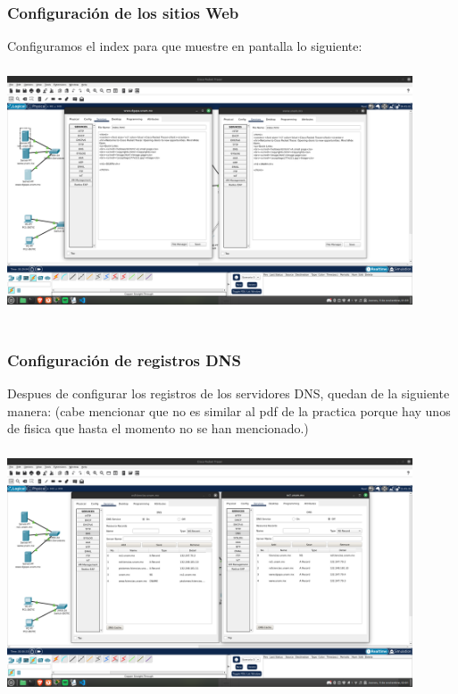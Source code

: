 \documentclass[14pt]{book}
\begin{document}
{\color{red} \subsubsection*{\textbf{Configuración de los sitios Web}}}
\vspace{1em}

Configuramos el index para que muestre en pantalla lo siguiente:\\

\includegraphics[width=12cm, height=8cm]{images/confweb.png}\\

{\color{red} \subsubsection*{\textbf{Configuración de registros DNS}}}
\vspace{1em}

Despues de configurar los registros de los servidores DNS, quedan de la siguiente manera: (cabe mencionar que no es similar al pdf de la practica porque hay unos de fisica que hasta el momento no se han mencionado.)\\

\includegraphics[width=12cm, height=8cm]{images/registros dns.png}\\
\end{document}

